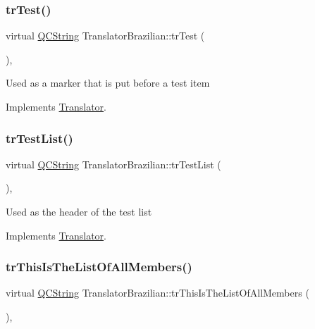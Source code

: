 \subsubsection{\texorpdfstring{trTest()}{trTest()}}
{\footnotesize\ttfamily virtual \mbox{\hyperlink{class_q_c_string}{Q\+C\+String}} Translator\+Brazilian\+::tr\+Test (\begin{DoxyParamCaption}{ }\end{DoxyParamCaption})\hspace{0.3cm}{\ttfamily [inline]}, {\ttfamily [virtual]}}

Used as a marker that is put before a test item 

Implements \mbox{\hyperlink{class_translator}{Translator}}.

\mbox{\label{class_translator_brazilian_a136a3d5a3c8dbc2aa2b1e36a1cd64943}} 
\subsubsection{\texorpdfstring{trTestList()}{trTestList()}}
{\footnotesize\ttfamily virtual \mbox{\hyperlink{class_q_c_string}{Q\+C\+String}} Translator\+Brazilian\+::tr\+Test\+List (\begin{DoxyParamCaption}{ }\end{DoxyParamCaption})\hspace{0.3cm}{\ttfamily [inline]}, {\ttfamily [virtual]}}

Used as the header of the test list 

Implements \mbox{\hyperlink{class_translator}{Translator}}.

\mbox{\label{class_translator_brazilian_ade336321eadb00091bc55a2bf10c1273}} 
\subsubsection{\texorpdfstring{trThisIsTheListOfAllMembers()}{trThisIsTheListOfAllMembers()}}
{\footnotesize\ttfamily virtual \mbox{\hyperlink{class_q_c_string}{Q\+C\+String}} Translator\+Brazilian\+::tr\+This\+Is\+The\+List\+Of\+All\+Members (\begin{DoxyParamCaption}{ }\end{DoxyParamCaption})\hspace{0.3cm}{\ttfamily [inline]}, {\ttfamily [virtual]}}

